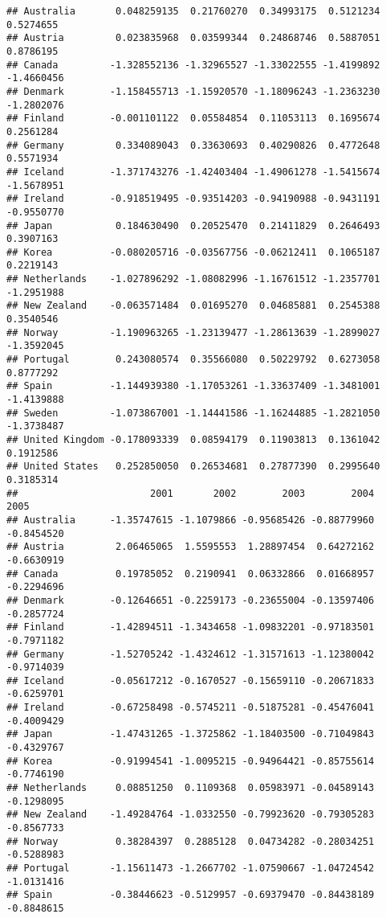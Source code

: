 \documentclass[
]{article}
\begin{document}
\begin{verbatim}
## Australia       0.048259135  0.21760270  0.34993175  0.5121234  0.5274655
## Austria         0.023835968  0.03599344  0.24868746  0.5887051  0.8786195
## Canada         -1.328552136 -1.32965527 -1.33022555 -1.4199892 -1.4660456
## Denmark        -1.158455713 -1.15920570 -1.18096243 -1.2363230 -1.2802076
## Finland        -0.001101122  0.05584854  0.11053113  0.1695674  0.2561284
## Germany         0.334089043  0.33630693  0.40290826  0.4772648  0.5571934
## Iceland        -1.371743276 -1.42403404 -1.49061278 -1.5415674 -1.5678951
## Ireland        -0.918519495 -0.93514203 -0.94190988 -0.9431191 -0.9550770
## Japan           0.184630490  0.20525470  0.21411829  0.2646493  0.3907163
## Korea          -0.080205716 -0.03567756 -0.06212411  0.1065187  0.2219143
## Netherlands    -1.027896292 -1.08082996 -1.16761512 -1.2357701 -1.2951988
## New Zealand    -0.063571484  0.01695270  0.04685881  0.2545388  0.3540546
## Norway         -1.190963265 -1.23139477 -1.28613639 -1.2899027 -1.3592045
## Portugal        0.243080574  0.35566080  0.50229792  0.6273058  0.8777292
## Spain          -1.144939380 -1.17053261 -1.33637409 -1.3481001 -1.4139888
## Sweden         -1.073867001 -1.14441586 -1.16244885 -1.2821050 -1.3738487
## United Kingdom -0.178093339  0.08594179  0.11903813  0.1361042  0.1912586
## United States   0.252850050  0.26534681  0.27877390  0.2995640  0.3185314
##                       2001       2002        2003        2004       2005
## Australia      -1.35747615 -1.1079866 -0.95685426 -0.88779960 -0.8454520
## Austria         2.06465065  1.5595553  1.28897454  0.64272162 -0.6630919
## Canada          0.19785052  0.2190941  0.06332866  0.01668957 -0.2294696
## Denmark        -0.12646651 -0.2259173 -0.23655004 -0.13597406 -0.2857724
## Finland        -1.42894511 -1.3434658 -1.09832201 -0.97183501 -0.7971182
## Germany        -1.52705242 -1.4324612 -1.31571613 -1.12380042 -0.9714039
## Iceland        -0.05617212 -0.1670527 -0.15659110 -0.20671833 -0.6259701
## Ireland        -0.67258498 -0.5745211 -0.51875281 -0.45476041 -0.4009429
## Japan          -1.47431265 -1.3725862 -1.18403500 -0.71049843 -0.4329767
## Korea          -0.91994541 -1.0095215 -0.94964421 -0.85755614 -0.7746190
## Netherlands     0.08851250  0.1109368  0.05983971 -0.04589143 -0.1298095
## New Zealand    -1.49284764 -1.0332550 -0.79923620 -0.79305283 -0.8567733
## Norway          0.38284397  0.2885128  0.04734282 -0.28034251 -0.5288983
## Portugal       -1.15611473 -1.2667702 -1.07590667 -1.04724542 -1.0131416
## Spain          -0.38446623 -0.5129957 -0.69379470 -0.84438189 -0.8848615

\end{verbatim}
\end{document}
